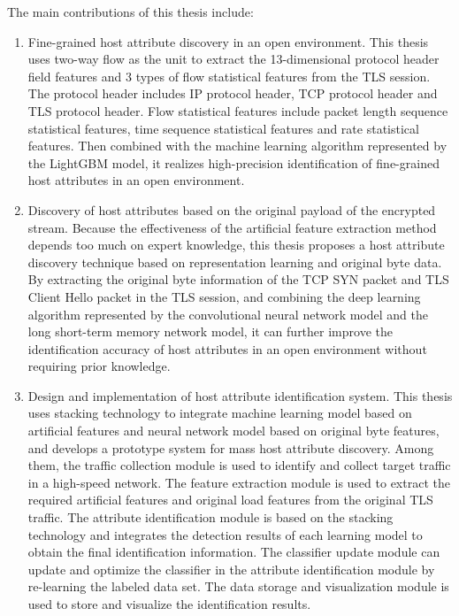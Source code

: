 The main contributions of this thesis include:
\begin{enumerate}
\item

Fine-grained host attribute discovery in an open environment. This thesis uses two-way flow as the unit to extract the 13-dimensional protocol header field features and 3 types of flow statistical features from the TLS session. The protocol header includes IP protocol header, TCP protocol header and TLS protocol header. Flow statistical features include packet length sequence statistical features, time sequence statistical features and rate statistical features. Then combined with the machine learning algorithm represented by the LightGBM model, it realizes high-precision identification of fine-grained host attributes in an open environment.
\item

Discovery of host attributes based on the original payload of the encrypted stream. Because the effectiveness of the artificial feature extraction method depends too much on expert knowledge, this thesis proposes a host attribute discovery technique based on representation learning and original byte data. By extracting the original byte information of the TCP SYN packet and TLS Client Hello packet in the TLS session, and combining the deep learning algorithm represented by the convolutional neural network model and the long short-term memory network model, it can further improve the identification accuracy of host attributes in an open environment without requiring prior knowledge.

\item
Design and implementation of host attribute identification system. This thesis uses stacking technology to integrate machine learning model based on artificial features and neural network model based on original byte features, and develops a prototype system for mass host attribute discovery. Among them, the traffic collection module is used to identify and collect target traffic in a high-speed network. The feature extraction module is used to extract the required artificial features and original load features from the original TLS traffic. The attribute identification module is based on the stacking technology and integrates the detection results of each learning model to obtain the final identification information. The classifier update module can update and optimize the classifier in the attribute identification module by re-learning the labeled data set. The data storage and visualization module is used to store and visualize the identification results.
\end{enumerate}

